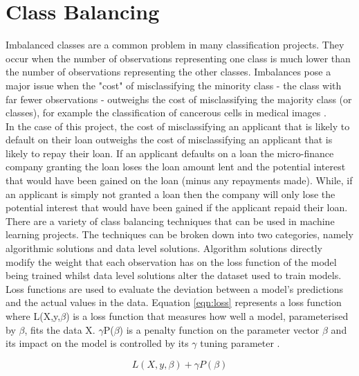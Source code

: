 \section{Class Balancing}

Imbalanced classes are a common problem in many classification projects. They occur when the number of observations representing one class is much lower than the number of observations representing the other classes. Imbalances pose a major issue when the "cost" of misclassifying the minority class - the class with far fewer observations - outweighs the cost of misclassifying the majority class (or classes), for example the classification of cancerous cells in medical images \parencite{Balancing2}. \\

In the case of this project, the cost of misclassifying an applicant that is likely to default on their loan outweighs the cost of misclassifying an applicant that is likely to repay their loan. If an applicant defaults on a loan the micro-finance company granting the loan loses the loan amount lent and the potential interest that would have been gained on the loan (minus any repayments made). While, if an applicant is simply not granted a loan then the company will only lose the potential interest that would have been gained if the applicant repaid their loan.  \\

There are a variety of class balancing techniques that can be used in machine learning projects. The techniques can be broken down into two categories, namely algorithmic solutions and data level solutions. Algorithm solutions directly modify the weight that each observation has on the loss function of the model being trained whilst data level solutions alter the dataset used to train models. \\

Loss functions are used to evaluate the deviation between a model's predictions and the actual values in the data. Equation \ref{eqn:loss} represents a loss function where L(X,y,$\beta$) is a loss function that measures how well a model, parameterised by $\beta$, fits the data X. $\gamma$P($\beta$) is a penalty function on the parameter vector $\beta$ and its impact on the model is controlled by its $\gamma$ tuning parameter \parencite{Loss}. 


\vspace{10pt}

\begin{equation} \label{eqn:loss}
L(X, y, \beta) + \gamma P(\beta)
\end{equation}

